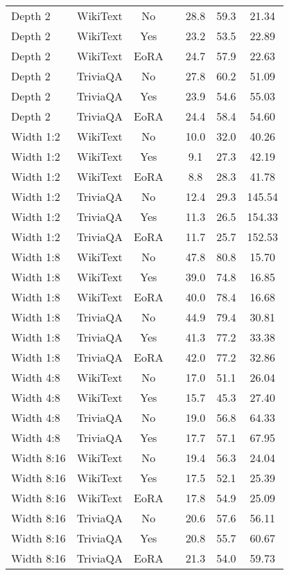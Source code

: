 \begin{longtable}{lcclccc}
\hline
\endlastfoot
Depth 2 & WikiText & No & & 28.8 & 59.3 & 21.34 \\
Depth 2 & WikiText & Yes & & 23.2 & 53.5 & 22.89 \\
Depth 2 & WikiText & EoRA & & 24.7 & 57.9 & 22.63 \\
Depth 2 & TriviaQA & No & & 27.8 & 60.2 & 51.09 \\
Depth 2 & TriviaQA & Yes & & 23.9 & 54.6 & 55.03 \\
Depth 2 & TriviaQA & EoRA & & 24.4 & 58.4 & 54.60 \\
Width 1:2 & WikiText & No & & 10.0 & 32.0 & 40.26 \\
Width 1:2 & WikiText & Yes & & 9.1 & 27.3 & 42.19 \\
Width 1:2 & WikiText & EoRA & & 8.8 & 28.3 & 41.78 \\
Width 1:2 & TriviaQA & No & & 12.4 & 29.3 & 145.54 \\
Width 1:2 & TriviaQA & Yes & & 11.3 & 26.5 & 154.33 \\
Width 1:2 & TriviaQA & EoRA & & 11.7 & 25.7 & 152.53 \\
Width 1:8 & WikiText & No & & 47.8 & 80.8 & 15.70 \\
Width 1:8 & WikiText & Yes & & 39.0 & 74.8 & 16.85 \\
Width 1:8 & WikiText & EoRA & & 40.0 & 78.4 & 16.68 \\
Width 1:8 & TriviaQA & No & & 44.9 & 79.4 & 30.81 \\
Width 1:8 & TriviaQA & Yes & & 41.3 & 77.2 & 33.38 \\
Width 1:8 & TriviaQA & EoRA & & 42.0 & 77.2 & 32.86 \\
Width 4:8 & WikiText & No & & 17.0 & 51.1 & 26.04 \\
Width 4:8 & WikiText & Yes & & 15.7 & 45.3 & 27.40 \\
Width 4:8 & TriviaQA & No & & 19.0 & 56.8 & 64.33 \\
Width 4:8 & TriviaQA & Yes & & 17.7 & 57.1 & 67.95 \\
Width 8:16 & WikiText & No & & 19.4 & 56.3 & 24.04 \\
Width 8:16 & WikiText & Yes & & 17.5 & 52.1 & 25.39 \\
Width 8:16 & WikiText & EoRA & & 17.8 & 54.9 & 25.09 \\
Width 8:16 & TriviaQA & No & & 20.6 & 57.6 & 56.11 \\
Width 8:16 & TriviaQA & Yes & & 20.8 & 55.7 & 60.67 \\
Width 8:16 & TriviaQA & EoRA & & 21.3 & 54.0 & 59.73 \\

\end{longtable}
